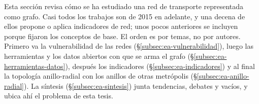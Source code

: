 
Esta sección revisa cómo se ha estudiado una red de transporte representada
como grafo. Casi todos los trabajos son de 2015 en adelante, y una decena de
ellos propone o aplica indicadores de red; unos pocos anteriores se incluyen
porque fijaron los conceptos de base. El orden es por temas, no por autores.
Primero va la vulnerabilidad de las redes (§\ref{subsec:ea-vulnerabilidad}),
luego las herramientas y los datos abiertos con que se arma el grafo
(§\ref{subsec:ea-herramientas-datos}), después los indicadores
(§\ref{subsec:ea-indicadores}) y al final la topología anillo-radial con los
anillos de otras metrópolis (§\ref{subsec:ea-anillo-radial}). La síntesis
(§\ref{subsec:ea-sintesis}) junta tendencias, debates y vacíos, y ubica ahí el
problema de esta tesis.
